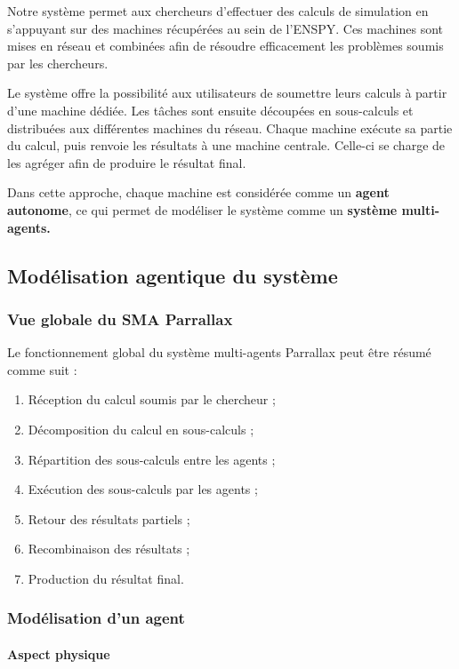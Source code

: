 \documentclass[12pt,a4paper]{report}
\theoremstyle{definition}
\begin{document}
Notre système permet aux chercheurs d’effectuer des calculs de simulation en s’appuyant sur des machines récupérées au sein de l’ENSPY. Ces machines sont mises en réseau et combinées afin de résoudre efficacement les problèmes soumis par les chercheurs.

Le système offre la possibilité aux utilisateurs de soumettre leurs calculs à partir d’une machine dédiée. Les tâches sont ensuite découpées en sous-calculs et distribuées aux différentes machines du réseau. Chaque machine exécute sa partie du calcul, puis renvoie les résultats à une machine centrale. Celle-ci se charge de les agréger afin de produire le résultat final.

Dans cette approche, chaque machine est considérée comme un \textbf{agent autonome}, ce qui permet de modéliser le système comme un \textbf{système multi-agents.}

\subsection{Modélisation agentique du système}

\subsubsection{Vue globale du SMA Parrallax}
Le fonctionnement global du système multi-agents Parrallax peut être résumé comme suit :
\begin{enumerate}
    \item Réception du calcul soumis par le chercheur ;
    \item Décomposition du calcul en sous-calculs ;
    \item Répartition des sous-calculs entre les agents ;
    \item Exécution des sous-calculs par les agents ;
    \item Retour des résultats partiels ;
    \item Recombinaison des résultats ;
    \item Production du résultat final.
\end{enumerate}

\subsubsection{Modélisation d’un agent}

\paragraph{Aspect physique}
\end{document}
